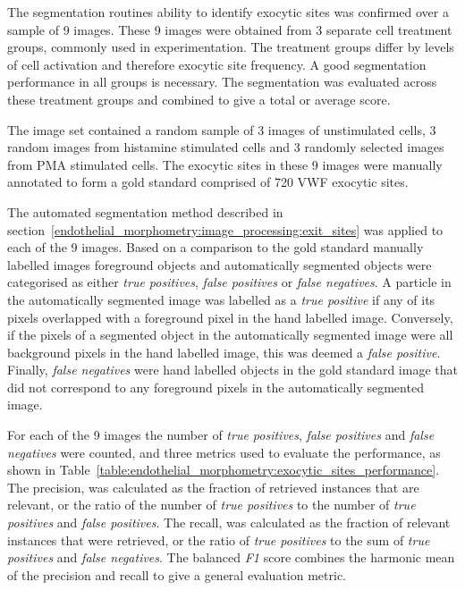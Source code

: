 The segmentation routines ability to identify exocytic sites was confirmed over a sample of 9 images. These 9 images were obtained from 3 separate cell treatment groups, commonly used in experimentation. The treatment groups differ by levels of cell activation and therefore exocytic site frequency. A good segmentation performance in all groups is necessary. The segmentation was evaluated across these treatment groups and combined to give a total or average score.

The image set contained a random sample of 3 images of unstimulated cells, 3 random images from histamine stimulated cells and 3 randomly selected images from PMA stimulated cells. The exocytic sites in these 9 images were manually annotated to form a gold standard comprised of 720 VWF exocytic sites.

The automated segmentation method described in section~\ref{endothelial_morphometry:image_processing:exit_sites} was applied to each of the 9 images. Based on a comparison to the gold standard manually labelled images foreground objects and automatically segmented objects were categorised as either \emph{true positives}, \emph{false positives} or \emph{false negatives}. A particle in the automatically segmented image was labelled as a \emph{true positive} if any of its pixels overlapped with a foreground pixel in the hand labelled image. Conversely, if the pixels of a segmented object in the automatically segmented image were all background pixels in the hand labelled image, this was deemed a \emph{false positive}. Finally, \emph{false negatives} were hand labelled objects in the gold standard image that did not correspond to any foreground pixels in the automatically segmented image.

For each of the 9 images the number of \emph{true positives}, \emph{false positives} and \emph{false negatives} were counted, and three metrics used to evaluate the performance, as shown in Table~\ref{table:endothelial_morphometry:exocytic_sites_performance}. The precision, was calculated as the fraction of retrieved instances that are relevant, or the ratio of the number of \emph{true positives} to the number of \emph{true positives} and \emph{false positives}. The recall, was calculated as the fraction of relevant instances that were retrieved, or the ratio of \emph{true positives} to the sum of \emph{true positives} and \emph{false negatives}. The balanced \emph{F1} score combines the harmonic mean of the precision and recall to give a general evaluation metric.

